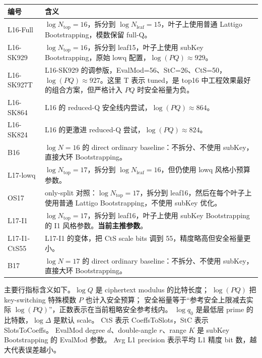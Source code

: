 \documentclass[UTF8,fontset=fandol]{ctexart}
\newcommand{\good}[1]{\textcolor{softgreen}{\textbf{#1}}}
\begin{document}
\begin{center}
\begin{tabular}{l|p{}}
\toprule
编号 & 含义 \\
\midrule
L16-Full & \(\log N_{\mathrm{top}}=16\)，拆分到 \(\log N_{\mathrm{leaf}}=15\)，叶子上使用普通 Lattigo Bootstrapping，模数保留 full-Q。\\
L16-SK929 & \(\log N_{\mathrm{top}}=16\)，拆分到 leaf15，叶子上使用 subKey Bootstrapping，原始 lowq 配置，\(\log(PQ)\approx929\)。\\
L16-SK927T & L16-SK929 的调参版，EvalMod=56、StC=26、CtS=50，\(\log(PQ)\approx927\)。这里 T 表示 tuned，是 top16 中工程效果最好的组合方案，但严格计入 \(PQ\) 时安全裕量为负。\\
L16-SK864 & L16 的 reduced-Q 安全线内尝试，\(\log(PQ)\approx864\)。\\
L16-SK824 & L16 的更激进 reduced-Q 尝试，\(\log(PQ)\approx824\)。\\
B16 & \(\log N=16\) 的 direct ordinary baseline：不拆分、不使用 subKey，直接大环 Bootstrapping。\\
L17-lowq & \(\log N_{\mathrm{top}}=17\)，拆分到 \(\log N_{\mathrm{leaf}}=16\)，但仍使用 lowq 风格小预算参数。\\
OS17 & only-split 对照：\(\log N_{\mathrm{top}}=17\)，拆分到 leaf16，然后在每个叶子上使用普通 Lattigo Bootstrapping，不使用 subKey 优化。\\
L17-I1 & \(\log N_{\mathrm{top}}=17\)，拆分到 leaf16，叶子上使用 subKey Bootstrapping 的 I1 风格参数。\good{当前主推参数}。\\
L17-I1-CtS55 & L17-I1 的变体，把 CtS scale bits 调到 55，精度略高但安全裕量更小。\\
B17 & \(\log N=17\) 的 direct ordinary baseline：不拆分、不使用 subKey，直接大环 Bootstrapping。\\
\bottomrule
\end{tabular}
\end{center}

主要行指标含义如下。\(\log Q\) 是 ciphertext modulus 的比特长度；
\(\log(PQ)\) 把 key-switching 特殊模数 \(P\) 也计入安全预算；
安全裕量等于“参考安全上限减去实际 \(\log(PQ)\)”，正数表示在当前粗略安全参考线内。
\(\log q_0\) 是最低层 prime 的比特数，\(\log\Delta\) 是默认 scale。
CtS 表示 CoeffsToSlots，StC 表示 SlotsToCoeffs。
EvalMod degree \(d\)、double-angle \(r\)、range \(K\) 是 subKey Bootstrapping 的 EvalMod 参数。
Avg L1 precision 表示平均 L1 精度 bit 数，越大代表误差越小。
\end{document}
